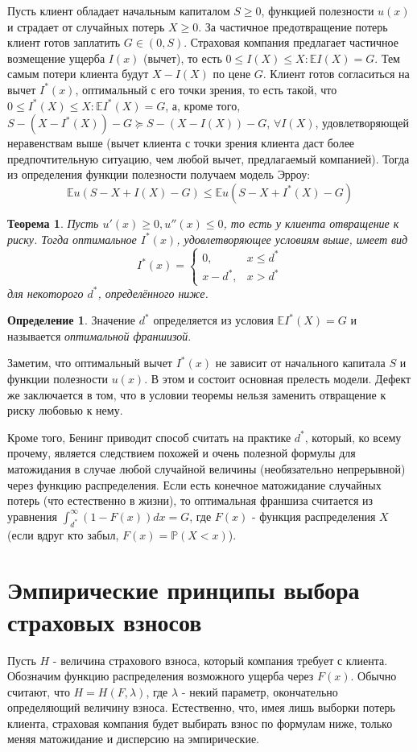 \documentclass{article}
\newtheorem{theorem}{Теорема}
\theoremstyle{definition}
\newtheorem{definition}{Определение}
\begin{document}
Пусть клиент обладает начальным капиталом $S \ge 0$, функцией полезности $u(x)$ и страдает от случайных потерь $X \ge 0$. За частичное предотвращение потерь клиент готов заплатить $G \in (0, S)$. Страховая компания предлагает частичное возмещение ущерба $I(x)$ (вычет), то есть $0 \le I(X) \le X: \mathbb{E}I(X) = G$. Тем самым потери клиента будут $X - I(X)$ по цене $G$. Клиент готов согласиться на вычет $I^*(x)$, оптимальный с его точки зрения, то есть такой, что $0 \le I^*(X) \le X: \mathbb{E}I^*(X) = G$, а, кроме того, $S - (X - I^*(X)) - G \succeq S - (X - I(X)) - G$, $\forall I(X)$, удовлетворяющей неравенствам выше (вычет клиента с точки зрения клиента даст более предпочтительную ситуацию, чем любой вычет, предлагаемый компанией). Тогда из определения функции полезности получаем модель Эрроу: $$\mathbb{E}u(S - X + I(X) - G) \le \mathbb{E}u(S - X + I^*(X) - G)$$
\begin{theorem}
Пусть $u'(x) \ge 0, u''(x) \le 0$, то есть у клиента отвращение к риску. Тогда оптимальное $I^*(x)$, удовлетворяющее условиям выше, имеет вид $$I^*(x) = \begin{cases}
0, & x \le d^* \\
x - d^*, & x > d^*
\end{cases}$$ для некоторого $d^*$, определённого ниже.
\end{theorem}
\begin{definition}
Значение $d^*$ определяется из условия $\mathbb{E}I^*(X) = G$ и называется \textit{оптимальной франшизой}.
\end{definition}
Заметим, что оптимальный вычет $I^*(x)$ не зависит от начального капитала $S$ и функции полезности $u(x)$. В этом и состоит основная прелесть модели. Дефект же заключается в том, что в условии теоремы нельзя заменить отвращение к риску любовью к нему.

Кроме того, Бенинг приводит способ считать на практике $d^*$, который, ко всему прочему, является следствием похожей и очень полезной формулы для матожидания в случае любой случайной величины (необязательно непрерывной) через функцию распределения. Если есть конечное матожидание случайных потерь (что естественно в жизни), то оптимальная франшиза считается из уравнения $\int_{d^*}^\infty (1 - F(x))dx = G$, где $F(x)$ - функция распределения $X$ (если вдруг кто забыл, $F(x) = \mathbb{P}(X < x)$).

\section{Эмпирические принципы выбора страховых взносов}
Пусть $H$ - величина страхового взноса, который компания требует с клиента. Обозначим функцию распределения возможного ущерба через $F(x)$. Обычно считают, что $H = H(F, \lambda)$, где $\lambda$ - некий параметр, окончательно определяющий величину взноса. Естественно, что, имея лишь выборки потерь клиента, страховая компания будет выбирать взнос по формулам ниже, только меняя матожидание и дисперсию на эмпирические.
\end{document}

